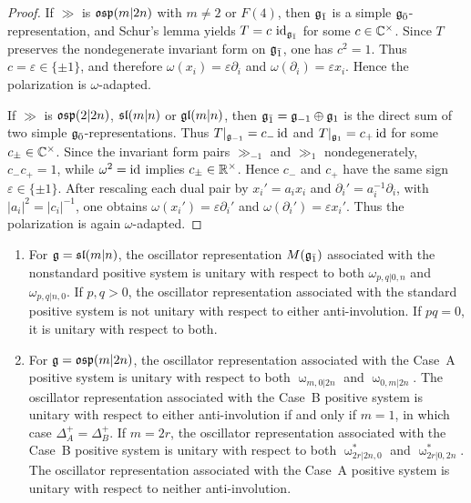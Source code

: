 \begin{proof}
If $\gg$ is $\osp(m\vert 2n)$ with $m\neq 2$ or $F(4)$, then $\odd$ is a simple $\even$-representation, and Schur's
lemma yields $T=c\,\id_{\odd}$ for some $c\in\CC^\times$. Since $T$
preserves the nondegenerate invariant form on $\odd$, one has $c^2=1$.
Thus $c=\varepsilon\in\{\pm1\}$, and therefore
$\omega(x_i)=\varepsilon\partial_i$ and
$\omega(\partial_i)=\varepsilon x_i$. Hence the polarization is
$\omega$-adapted.

If $\gg$ is $\osp(2\vert 2n)$, $\sl(m\vert n)$ or $\glmn$, then
$\odd=\gg_{-1}\oplus\gg_{1}$ is the direct sum of two simple
$\even$-representations. Thus
$T|_{\gg_{-1}}=c_{-}\id$ and $T|_{\gg_{1}}=c_{+}\id$ for some
$c_{\pm}\in\CC^\times$. Since the invariant form pairs $\gg_{-1}$ and
$\gg_{1}$ nondegenerately, $c_{-}c_{+}=1$, while $\omega^2=\id$ implies
$c_{\pm}\in\RR^\times$. Hence $c_{-}$ and $c_{+}$ have the same sign
$\varepsilon\in\{\pm1\}$. After rescaling each dual pair by
$x_i'=a_i x_i$ and $\partial_i'=a_i^{-1}\partial_i$, with
$|a_i|^2=|c_i|^{-1}$, one obtains
$\omega(x_i')=\varepsilon\partial_i'$ and
$\omega(\partial_i')=\varepsilon x_i'$. Thus the polarization is again
$\omega$-adapted.
\end{proof}

\begin{corollary} \begin{enumerate} \item[(a)] For $\gg=\sl(m\vert n)$, the oscillator representation $M(\odd)$ associated with the nonstandard positive system is unitary with respect to both $\omega_{p,q\vert 0,n}$ and $\omega_{p,q\vert n,0}$. If $p,q>0$, the oscillator representation associated with the standard positive system is not unitary with respect to either anti-involution. If $pq=0$, it is unitary with respect to both. \item[(b)] For $\gg=\osp(m\vert 2n)$, the oscillator representation associated with the Case~A positive system is unitary with respect to both $\upomega_{m,0\vert 2n}$ and $\upomega_{0,m\vert 2n}$. The oscillator representation associated with the Case~B positive system is unitary with respect to either anti-involution if and only if $m=1$, in which case $\Delta_A^{+}=\Delta_B^{+}$. If $m=2r$, the oscillator representation associated with the Case~B positive system is unitary with respect to both $\upomega^{*}_{2r\vert2n,0}$ and $\upomega^{*}_{2r\vert0,2n}$. The oscillator representation associated with the Case~A positive system is unitary with respect to neither anti-involution. \end{enumerate} \end{corollary}


